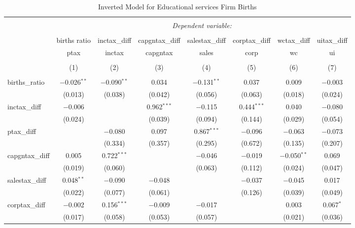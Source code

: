 
\begin{table}[!htbp] \centering 
  \caption{Inverted Model for  Educational services Firm Births} 
  \label{61rd} 
\footnotesize 
\begin{tabular}{@{\extracolsep{5pt}}lccccccc} 
\\[-1.8ex]\hline 
\hline \\[-1.8ex] 
 & \multicolumn{7}{c}{\textit{Dependent variable:}} \\ 
\cline{2-8} 
\\[-1.8ex] & births ratio & inctax\_diff & capgntax\_diff & salestax\_diff & corptax\_diff & wctax\_diff & uitax\_diff \\ 
 & ptax & inctax & capgntax & sales & corp & wc & ui \\ 
\\[-1.8ex] & (1) & (2) & (3) & (4) & (5) & (6) & (7)\\ 
\hline \\[-1.8ex] 
 births\_ratio & $-$0.026$^{**}$ & $-$0.090$^{**}$ & 0.034 & $-$0.131$^{**}$ & 0.037 & 0.009 & $-$0.003 \\ 
  & (0.013) & (0.038) & (0.042) & (0.056) & (0.063) & (0.018) & (0.024) \\ 
  inctax\_diff & $-$0.006 &  & 0.962$^{***}$ & $-$0.115 & 0.444$^{***}$ & 0.040 & $-$0.080 \\ 
  & (0.024) &  & (0.039) & (0.094) & (0.144) & (0.029) & (0.054) \\ 
  ptax\_diff &  & $-$0.080 & 0.097 & 0.867$^{***}$ & $-$0.096 & $-$0.063 & $-$0.073 \\ 
  &  & (0.334) & (0.357) & (0.295) & (0.672) & (0.135) & (0.207) \\ 
  capgntax\_diff & 0.005 & 0.722$^{***}$ &  & $-$0.046 & $-$0.019 & $-$0.050$^{**}$ & 0.069 \\ 
  & (0.019) & (0.060) &  & (0.063) & (0.112) & (0.024) & (0.047) \\ 
  salestax\_diff & 0.048$^{**}$ & $-$0.090 & $-$0.048 &  & $-$0.037 & $-$0.045 & 0.017 \\ 
  & (0.022) & (0.077) & (0.061) &  & (0.126) & (0.039) & (0.049) \\ 
  corptax\_diff & $-$0.002 & 0.156$^{***}$ & $-$0.009 & $-$0.017 &  & 0.003 & 0.067$^{*}$ \\ 
  & (0.017) & (0.058) & (0.053) & (0.057) &  & (0.021) & (0.036) \\ 

\end{tabular}
\end{table}
